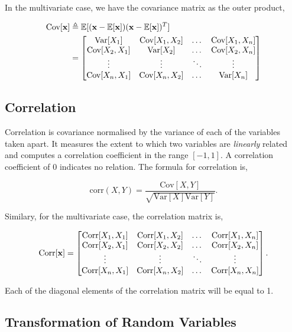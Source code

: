 \documentclass[11pt]{amsart}
\begin{document}
In the multivariate case, we have the covariance matrix as the outer product,

\begin{align}
\text{Cov}[\mathbf{x}] &\triangleq \mathbb{E}[(\mathbf{x} - \mathbb{E}[\mathbf{x}])(\mathbf{x} - \mathbb{E}[\mathbf{x}])^T] \notag \\
&= \begin{bmatrix}
\text{Var}[X_1] & \text{Cov}[X_1, X_2] & \dots & \text{Cov}[X_1, X_n] \\
\text{Cov}[X_2, X_1] & \text{Var}[X_2] & \dots & \text{Cov}[X_2, X_n] \\
\vdots & \vdots & \ddots & \vdots \\
\text{Cov}[X_n, X_1] & \text{Cov}[X_n, X_2] &\dots & \text{Var}[X_n]
\end{bmatrix} \notag
\end{align}

\subsection{Correlation}

Correlation is covariance normalised by the variance of each of the variables taken apart. It measures the extent to which two variables are \emph{linearly} related and computes a correlation coefficient in the range $[-1, 1]$. A correlation coefficient of 0 indicates no relation. The formula for correlation is,

$$\text{corr}(X, Y) = \frac{\text{Cov}[X, Y]}{\sqrt{\text{Var}[X]\text{Var}[Y]}}.$$

Similary, for the multivariate case, the correlation matrix is,

$$
\text{Corr}[\mathbf{x}] = \begin{bmatrix}
\text{Corr}[X_1, X_1] & \text{Corr}[X_1, X_2] & \dots & \text{Corr}[X_1, X_n] \\
\text{Corr}[X_2, X_1] & \text{Corr}[X_2, X_2] & \dots & \text{Corr}[X_2, X_n] \\
\vdots & \vdots & \ddots & \vdots \\
\text{Corr}[X_n, X_1] & \text{Corr}[X_n, X_2] &\dots & \text{Corr}[X_n, X_n]
\end{bmatrix}. \notag
$$

Each of the diagonal elements of the correlation matrix will be equal to 1.

\subsection{Transformation of Random Variables}
\end{document}
